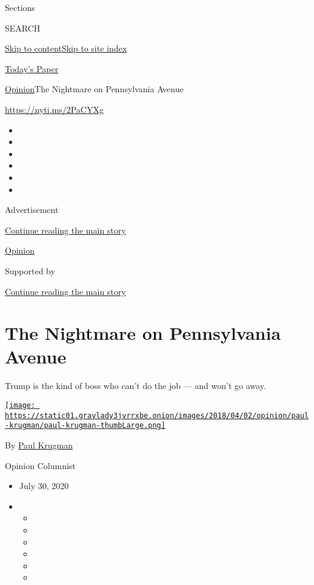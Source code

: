 Sections

SEARCH

\protect\hyperlink{site-content}{Skip to
content}\protect\hyperlink{site-index}{Skip to site index}

\href{https://myaccount.nytimes3xbfgragh.onion/auth/login?response_type=cookie\&client_id=vi}{}

\href{https://www.nytimes3xbfgragh.onion/section/todayspaper}{Today's
Paper}

\href{/section/opinion}{Opinion}\textbar{}The Nightmare on Pennsylvania
Avenue

\href{https://nyti.ms/2PaCYXg}{https://nyti.ms/2PaCYXg}

\begin{itemize}
\item
\item
\item
\item
\item
\item
\end{itemize}

Advertisement

\protect\hyperlink{after-top}{Continue reading the main story}

\href{/section/opinion}{Opinion}

Supported by

\protect\hyperlink{after-sponsor}{Continue reading the main story}

\hypertarget{the-nightmare-on-pennsylvania-avenue}{%
\section{The Nightmare on Pennsylvania
Avenue}\label{the-nightmare-on-pennsylvania-avenue}}

Trump is the kind of boss who can't do the job --- and won't go away.

\href{https://www.nytimes3xbfgragh.onion/by/paul-krugman}{\texttt{[image: https://static01.graylady3jvrrxbe.onion/images/2018/04/02/opinion/paul-krugman/paul-krugman-thumbLarge.png]}}

By \href{https://www.nytimes3xbfgragh.onion/by/paul-krugman}{Paul
Krugman}

Opinion Columnist

\begin{itemize}
\item
  July 30, 2020
\item
  \begin{itemize}
  \item
  \item
  \item
  \item
  \item
  \item
  \end{itemize}
\end{itemize}

